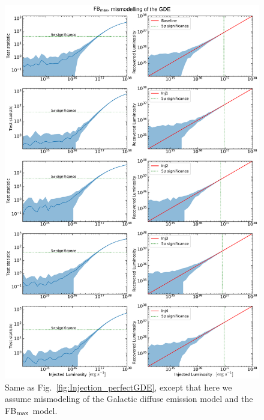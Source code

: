 \documentclass[doublespace,draft,nopageskip]{VTthesis} %
\begin{document}
\begin{appendices}
\begin{figure}
    \begin{center}
    \includegraphics[scale = 0.42]{Figures/CTA/all-TS-mis-True-Fermi-min-False.pdf}
    \caption{Same as Fig.~\ref{fig:Injection_perfectGDE}, except that here we assume mismodeling of the Galactic diffuse emission model and the FB$_{\rm max}$ model.}\label{fig:InjectionmismodelingFBmax}
    \end{center}
\end{figure}


\end{appendices}
\end{document}
